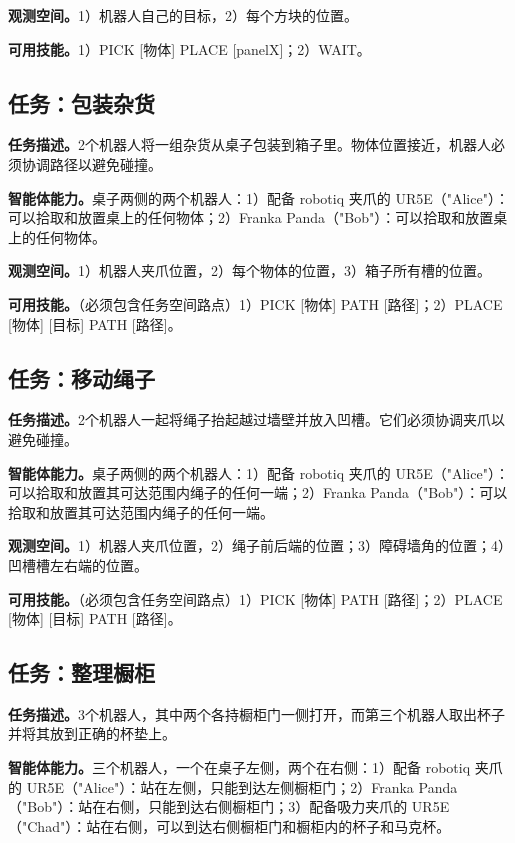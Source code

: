\documentclass[UTF8, a4paper, 12pt]{article}
\begin{document}
\textbf{观测空间。}1）机器人自己的目标，2）每个方块的位置。

\textbf{可用技能。}1）PICK [物体] PLACE [panelX]；2）WAIT。

\subsection{任务：包装杂货}

\textbf{任务描述。}2个机器人将一组杂货从桌子包装到箱子里。物体位置接近，机器人必须协调路径以避免碰撞。

\textbf{智能体能力。}桌子两侧的两个机器人：1）配备 robotiq 夹爪的 UR5E（"Alice"）：可以拾取和放置桌上的任何物体；2）Franka Panda（"Bob"）：可以拾取和放置桌上的任何物体。

\textbf{观测空间。}1）机器人夹爪位置，2）每个物体的位置，3）箱子所有槽的位置。

\textbf{可用技能。}（必须包含任务空间路点）1）PICK [物体] PATH [路径]；2）PLACE [物体] [目标] PATH [路径]。

\subsection{任务：移动绳子}

\textbf{任务描述。}2个机器人一起将绳子抬起越过墙壁并放入凹槽。它们必须协调夹爪以避免碰撞。

\textbf{智能体能力。}桌子两侧的两个机器人：1）配备 robotiq 夹爪的 UR5E（"Alice"）：可以拾取和放置其可达范围内绳子的任何一端；2）Franka Panda（"Bob"）：可以拾取和放置其可达范围内绳子的任何一端。

\textbf{观测空间。}1）机器人夹爪位置，2）绳子前后端的位置；3）障碍墙角的位置；4）凹槽槽左右端的位置。

\textbf{可用技能。}（必须包含任务空间路点）1）PICK [物体] PATH [路径]；2）PLACE [物体] [目标] PATH [路径]。

\subsection{任务：整理橱柜}

\textbf{任务描述。}3个机器人，其中两个各持橱柜门一侧打开，而第三个机器人取出杯子并将其放到正确的杯垫上。

\textbf{智能体能力。}三个机器人，一个在桌子左侧，两个在右侧：1）配备 robotiq 夹爪的 UR5E（"Alice"）：站在左侧，只能到达左侧橱柜门；2）Franka Panda（"Bob"）：站在右侧，只能到达右侧橱柜门；3）配备吸力夹爪的 UR5E（"Chad"）：站在右侧，可以到达右侧橱柜门和橱柜内的杯子和马克杯。
\end{document}
